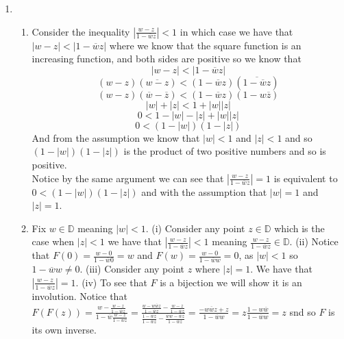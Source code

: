 \documentclass[12pt]{amsart}
\theoremstyle{definition}
\begin{document}
\begin{enumerate}
\begin{enumerate}[label=(\alph*)]
\end{enumerate}
\item 
\begin{enumerate}
    \item Consider the inequality $\left|\frac{w-z}{1-\overline{w}z}\right|<1$ in which case we have that $\left|{w-z}\right|<\left|{1-\overline{w}z}\right|$ where we know that the square function is an increasing function, and both sides are positive so we know that 
    $$\left|{w-z}\right|<\left|{1-\overline{w}z}\right|$$
    $$\left({w-z}\right)\left({\overline{w-z}}\right)<\left({1-\overline{w}z}\right)\left(\overline{1-\overline{w}z}\right)$$
    $$\left({w-z}\right)\left({\overline{w}-\overline{z}}\right)<\left({1-\overline{w}z}\right)\left({1-w\overline{z}}\right)$$
    $$|w|+|z|<1+|w||z|$$
    $$0<1-|w|-|z|+|w||z|$$
    $$0<(1-|w|)(1-|z|)$$
And from the assumption we know that $|w|<1$ and $|z|<1$ and so $(1-|w|)(1-|z|)$ is the product of two positive numbers and so is positive.\\

Notice by the same argument we can see that $\left|\frac{w-z}{1-\overline{w}z}\right|=1$ is equivalent to $0<(1-|w|)(1-|z|)$ and with the assumption that $|w|=1$ and $|z|=1$. \\

\item Fix $w\in \mathbb{D}$ meaning $|w|<1$. (i) Consider any point $z\in\mathbb{D}$ which is the case when $|z|<1$ we have that $\left|\frac{w-z}{1-\overline{w}z}\right|<1$ meaning $\frac{w-z}{1-\overline{w}z}\in \mathbb{D}$.
(ii) Notice that $F(0)=\frac{w-0}{1-\overline{w}0}=w$ and $F(w)=\frac{w-0}{1-\overline{w}w}=0$, as $|w|<1$ so $1-\overline{w}w\neq 0$. 
(iii) Consider any point $z$ where $|z|=1$. We have that $\left|\frac{w-z}{1-\overline{w}z}\right|=1$.
(iv) To see that $F$ is a bijection we will show it is an involution. Notice that $F(F(z))= \frac{w-\frac{w-z}{1-\overline{w}z}}{1-\overline{w}\frac{w-z}{1-\overline{w}z}}=\frac{\frac{w-w\overline{w}z}{1-\overline{w}z}-\frac{w-z}{1-\overline{w}z}}{\frac{1-\overline{w}z}{1-\overline{w}z}-\frac{\overline{w}w-\overline{w}z}{1-\overline{w}z}}=\frac{-w\overline{w}z+z}{1-\overline{w}w}=z\frac{1-w\overline{w}}{1-\overline{w}w}=z$ snd so 
$F$ is its own inverse.
    
\end{enumerate}

\end{enumerate}
\end{document}
